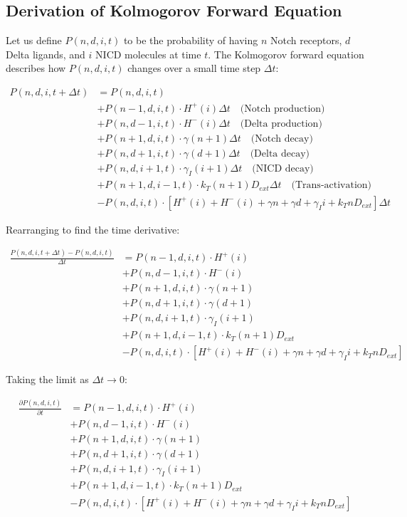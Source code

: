 \documentclass{article}
\begin{document}
\begin{flushleft}

\subsection*{Derivation of Kolmogorov Forward Equation}

Let us define $P(n,d,i,t)$ to be the probability of having $n$ Notch receptors, $d$ Delta ligands, and $i$ NICD molecules at time $t$. The Kolmogorov forward equation describes how $P(n,d,i,t)$ changes over a small time step $\Delta t$:

\begin{align*}
P(n,d,i,t+\Delta t) &= P(n,d,i,t) \\
&+ P(n-1,d,i,t) \cdot H^+(i) \Delta t \quad \text{(Notch production)} \\
&+ P(n,d-1,i,t) \cdot H^-(i) \Delta t \quad \text{(Delta production)} \\
&+ P(n+1,d,i,t) \cdot \gamma(n+1)\Delta t \quad \text{(Notch decay)} \\
&+ P(n,d+1,i,t) \cdot \gamma(d+1)\Delta t \quad \text{(Delta decay)} \\
&+ P(n,d,i+1,t) \cdot \gamma_I(i+1)\Delta t \quad \text{(NICD decay)} \\
&+ P(n+1,d,i-1,t) \cdot k_T(n+1)D_{ext}\Delta t \quad \text{(Trans-activation)} \\
&- P(n,d,i,t) \cdot [H^+(i) + H^-(i) + \gamma n + \gamma d + \gamma_I i + k_T n D_{ext}]\Delta t
\end{align*}

Rearranging to find the time derivative:

\begin{align*}
\frac{P(n,d,i,t+\Delta t) - P(n,d,i,t)}{\Delta t} &= P(n-1,d,i,t) \cdot H^+(i) \\
&+ P(n,d-1,i,t) \cdot H^-(i) \\
&+ P(n+1,d,i,t) \cdot \gamma(n+1) \\
&+ P(n,d+1,i,t) \cdot \gamma(d+1) \\
&+ P(n,d,i+1,t) \cdot \gamma_I(i+1) \\
&+ P(n+1,d,i-1,t) \cdot k_T(n+1)D_{ext} \\
&- P(n,d,i,t) \cdot [H^+(i) + H^-(i) + \gamma n + \gamma d + \gamma_I i + k_T n D_{ext}]
\end{align*}

Taking the limit as $\Delta t \rightarrow 0$:

\begin{align*}
\frac{\partial P(n,d,i,t)}{\partial t} &= P(n-1,d,i,t) \cdot H^+(i) \\
&+ P(n,d-1,i,t) \cdot H^-(i) \\
&+ P(n+1,d,i,t) \cdot \gamma(n+1) \\
&+ P(n,d+1,i,t) \cdot \gamma(d+1) \\
&+ P(n,d,i+1,t) \cdot \gamma_I(i+1) \\
&+ P(n+1,d,i-1,t) \cdot k_T(n+1)D_{ext} \\
&- P(n,d,i,t) \cdot [H^+(i) + H^-(i) + \gamma n + \gamma d + \gamma_I i + k_T n D_{ext}]
\end{align*}


\end{flushleft}
\end{document}
